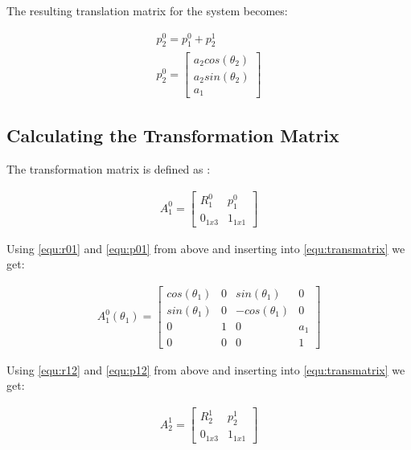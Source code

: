 \documentclass[a4paper, titlepage]{article}
\begin{document}
The resulting translation matrix for the system becomes:

\begin{equation}
\begin{split}
p^0_{2} = p^0_{1} + p^1_{2} \\ 
p^0_{2} = 
\begin{bmatrix}
a_{2}cos(\theta_{2}) \\ 
a_{2}sin(\theta_{2}) \\ 
a_{1}
\end{bmatrix}
\end{split}
\label{equ:translationmatrix}
\end{equation}

 

\subsection{Calculating the Transformation Matrix}

The transformation matrix is defined as \citep[p.15]{ho90}:

\begin{equation}
\begin{split}
A^0_{1}= 
\begin{bmatrix}
R^0_{1} & p^0_{1} \\  
0_{1x3} &  1_{1x1}
\end{bmatrix}
\end{split}
\label{equ:transmatrix}
\end{equation}

Using \ref{equ:r01} and \ref{equ:p01} from above and inserting into \ref{equ:transmatrix} we get:

\begin{equation}
\begin{split}
A^0_{1}(\theta_{1}) = 
\begin{bmatrix}
cos(\theta_{1}) & 0 & sin(\theta_{1}) & 0 \\ 
sin(\theta_{1}) & 0 & -cos(\theta_{1}) & 0  \\ 
0 & 1 & 0 & a_{1} \\
0 & 0 & 0 & 1
\end{bmatrix}
\end{split}
\label{equ:a01}
\end{equation}

Using \ref{equ:r12} and \ref{equ:p12} from above and inserting into \ref{equ:transmatrix} we get:


\begin{equation}
\begin{split}
A^1_{2}= 
\begin{bmatrix}
R^1_{2} & p^1_{2} \\  
0_{1x3} &  1_{1x1}
\end{bmatrix}
\end{split}
\end{equation}
\end{document}

